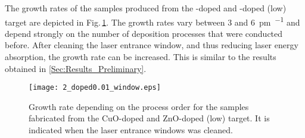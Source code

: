 The growth rates of the samples produced from the -doped and -doped (low) target are depicted in Fig.\,\ref{Fig:Results_2_windowCleaning}.
The growth rates vary between 3 and \qty{6}{\pm\per\pulse} and depend strongly on the number of deposition processes that were conducted before.
After cleaning the laser entrance window, and thus reducing laser energy absorption, the growth rate can be increased.
This is similar to the results obtained in \ref{Sec:Results_Preliminary}. 
\begin{figure}
    \centering
    \texttt{[image: 2\_doped0.01\_window.eps]}
    \caption{
        Growth rate depending on the process order for the samples fabricated from the CuO-doped and ZnO-doped (low) target.
        It is indicated when the laser entrance windows was cleaned.
    }
    \label{Fig:Results_2_windowCleaning}
\end{figure}

